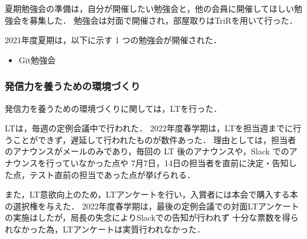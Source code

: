 夏期勉強会の準備は，自分が開催したい勉強会と，他の会員に開催してほしい勉強会を募集した．
勉強会は対面で開催され，部屋取りはTriRを用いて行った．

2021年度夏期は，以下に示す 1 つの勉強会が開催された．

\begin{itemize}
    \item Git勉強会
\end{itemize}


\subsubsection*{発信力を養うための環境づくり}
発信力を養うための環境づくりに関しては，LTを行った．

LTは，毎週の定例会議中で行われた．
2022年度春学期は，LTを担当週までに行うことができず，遅延して行われたものが数件あった．
理由としては，担当者のアナウンスがメールのみであり，毎回の LT 後のアナウンスや，Slack でのアナウンスを行っていなかった点や
7月7日，14日の担当者を直前に決定・告知した点，テスト直前の担当であった点が挙げられる．

また，LT意欲向上のため，LTアンケートを行い，入賞者には本会で購入する本の選択権を与えた．
2022年度春学期は，最後の定例会議での対面LTアンケートの実施はしたが，局長の失念によりSlackでの告知が行われず
十分な票数を得られなかった為，LTアンケートは実質行われなかった．
